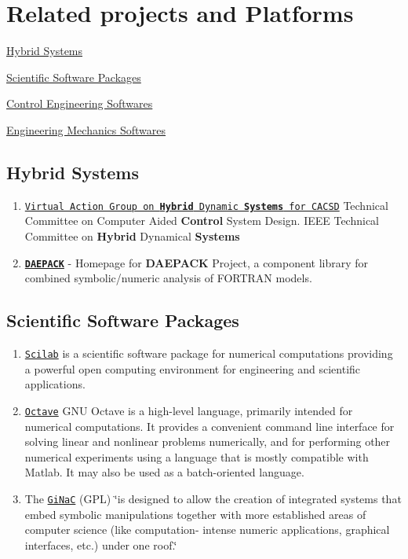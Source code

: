 \hypertarget{related}{}\section{Related projects and Platforms}\label{related}
\hyperlink{related_hybrid}{Hybrid Systems} \par
 \hyperlink{related_ssp}{Scientific Software Packages}\par
 \hyperlink{related_ces}{Control Engineering Softwares}\par
 \hyperlink{related_ems}{Engineering Mechanics Softwares}\par
\hypertarget{related_hybrid}{}\subsection{Hybrid Systems}\label{related_hybrid}
\begin{enumerate}
\item \href{http://www-er.df.op.dlr.de/cacsd/hds/index.shtml}{\tt Virtual Action Group on {\bf Hybrid} Dynamic {\bf Systems} for CACSD} Technical Committee on Computer Aided {\bf Control} System Design. IEEE Technical Committee on {\bf Hybrid} Dynamical {\bf Systems}\item \href{http://yoric.mit.edu/daepack/daepack.html}{\tt {\bf DAEPACK}} - Homepage for {\bf DAEPACK} Project, a component library for combined symbolic/numeric analysis of FORTRAN models.\end{enumerate}
\hypertarget{related_ssp}{}\subsection{Scientific Software Packages}\label{related_ssp}
\begin{enumerate}
\item \href{http://www-rocq.inria.fr/scilab/}{\tt Scilab} is a scientific software package for numerical computations providing a powerful open computing environment for engineering and scientific applications.\item \href{http://www.octave.org/}{\tt Octave} GNU Octave is a high-level language, primarily intended for numerical computations. It provides a convenient command line interface for solving linear and nonlinear problems numerically, and for performing other numerical experiments using a language that is mostly compatible with Matlab. It may also be used as a batch-oriented language.\item The \href{http://www.ginac.de/}{\tt Gi\-Na\-C} (GPL) \char`\"{}is designed to allow the creation of integrated systems that embed symbolic manipulations together with more established areas of computer science (like computation- intense numeric applications, graphical interfaces, etc.) under one roof.\char`\"{}\end{enumerate}
